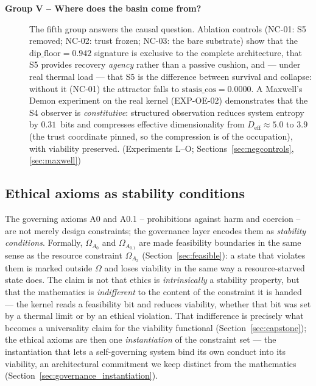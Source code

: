 \documentclass[11pt, a4paper]{article}
\begin{document}
\begin{description}
  \item[\textbf{Group V -- Where does the basin come from?}]
    The fifth group answers the causal question.
    Ablation controls (NC-01: S5 removed; NC-02: trust frozen;
    NC-03: the bare substrate) show that the $\text{dip\_floor}=0.942$
    signature is exclusive to the complete architecture, that S5 provides
    recovery \emph{agency} rather than a passive cushion, and --- under real
    thermal load --- that S5 is the difference between survival and collapse:
    without it (NC-01) the attractor falls to $\text{stasis\_cos}=0.0000$.
    A Maxwell's Demon experiment on the real kernel (EXP-OE-02) demonstrates
    that the S4 observer is \emph{constitutive}: structured observation reduces
    system entropy by $0.31$~bits and compresses effective dimensionality from
    $D_\text{eff}\approx5.0$ to $3.9$ (the trust coordinate pinned, so the
    compression is of the occupation), with viability preserved.
    (Experiments L--O; Sections~\ref{sec:negcontrols}, \ref{sec:maxwell})

\end{description}

\subsection{Ethical axioms as stability conditions}

The governing axioms A0 and A0.1 -- prohibitions against harm and coercion --
are not merely design constraints; the governance layer encodes them as
\emph{stability conditions}.
Formally, $\Omega_{A_0}$ and $\Omega_{A_{0.1}}$ are made feasibility
boundaries in the same sense as the resource constraint $\Omega_{A_3}$
(Section~\ref{sec:feasible}):
a state that violates them is marked outside $\Omega$ and loses
viability in the same way a resource-starved state does.
The claim is not that ethics is \emph{intrinsically} a stability property,
but that the mathematics is \emph{indifferent} to the content of the
constraint it is handed --- the kernel reads a feasibility bit and reduces
viability, whether that bit was set by a thermal limit or by an ethical
violation. That indifference is precisely what becomes a universality claim
for the viability functional (Section~\ref{sec:capstone}); the ethical axioms
are then one \emph{instantiation} of the constraint set --- the instantiation
that lets a self-governing system bind its own conduct into its viability,
an architectural commitment we keep distinct from the mathematics
(Section~\ref{sec:governance_instantiation}).
\end{document}
